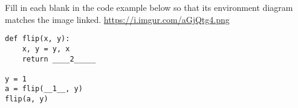 \begin{blocksection}
\question Fill in each blank in the code example below so that its environment diagram matches the image linked.
\newline
\url{https://i.imgur.com/aGjQtg4.png}
\newline

\begin{lstlisting}
def flip(x, y):
    x, y = y, x
    return ____2_____

y = 1
a = flip(__1__, y)
flip(a, y)
\end{lstlisting}

\end{blocksection}
\begin{blocksection}
\end{blocksection}